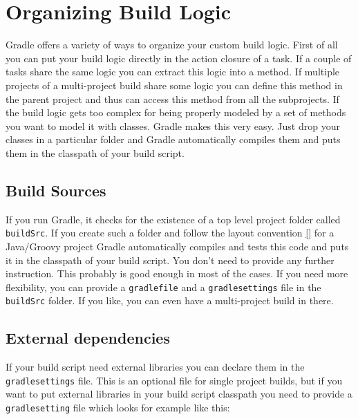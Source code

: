 \chapter{Organizing Build Logic} %
\label{cha:organizing_build_logic}
Gradle offers a variety of ways to organize your custom build logic. First of all you can put your build logic directly in the action closure of a task. If a couple of tasks share the same logic you can extract this logic into a method. If multiple projects of a multi-project build share some logic you can define this method in the parent project and thus can access this method from all the subprojects. If the build logic gets too complex for being properly modeled by a set of methods you want to model it with classes. Gradle makes this very easy. Just drop your classes in a particular folder and Gradle automatically compiles them and puts them in the classpath of your build script.

\section{Build Sources} %
\label{sec:build_sources}
If you run Gradle, it checks for the existence of a top level project folder called \texttt{buildSrc}. If you create such a folder and follow the layout convention \ref{} for a Java/Groovy project Gradle automatically compiles and tests this code and puts it in the classpath of your build script. You don't need to provide any further instruction. This probably is good enough in most of the cases. If you need more flexibility, you can provide a \texttt{gradlefile} and a \texttt{gradlesettings} file in the \texttt{buildSrc} folder. If you like, you can even have a multi-project build in there.

\section{External dependencies} %
\label{sec:external_dependencies}
If your build script need external libraries you can declare them in the \texttt{gradlesettings} file. This is an optional file for single project builds, but if you want to put external libraries in your build script classpath you need to provide a \texttt{gradlesetting} file which looks for example like this:


